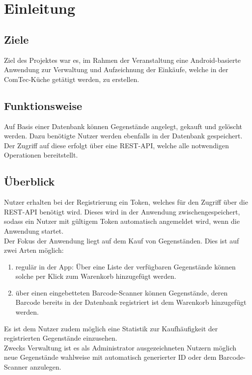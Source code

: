 \section{Einleitung}\label{sec:einleitung}

\subsection{Ziele}\label{subsec:ziele}

Ziel des Projektes war es, im Rahmen der Veranstaltung  eine Android-basierte Anwendung zur Verwaltung und Aufzeichnung der Einkäufe, welche in der ComTec-Küche getätigt werden, zu erstellen.

\subsection{Funktionsweise}\label{subsec:funktionsweise}

Auf Basis einer Datenbank können Gegenstände angelegt, gekauft und gelöscht werden.
Dazu benötigte Nutzer werden ebenfalls in der Datenbank gespeichert.
Der Zugriff auf diese erfolgt über eine REST-API, welche alle notwendigen Operationen bereitstellt.

\subsection{Überblick}\label{subsec:überblick}

Nutzer erhalten bei der Registrierung ein Token, welches für den Zugriff über die REST-API benötigt wird.
Dieses wird in der Anwendung zwischengespeichert, sodass ein Nutzer mit gültigem Token automatisch angemeldet wird, wenn die Anwendung startet. \\
Der Fokus der Anwendung liegt auf dem Kauf von Gegenständen.
Dies ist auf zwei Arten möglich:

\begin{enumerate}
	\item regulär in der App: Über eine Liste der verfügbaren Gegenstände können solche per Klick zum Warenkorb hinzugefügt werden.

	\item über einen eingebetteten Barcode-Scanner können Gegenstände, deren Barcode bereits in der Datenbank registriert ist dem Warenkorb hinzugefügt werden.
\end{enumerate}

Es ist dem Nutzer zudem möglich eine Statistik zur Kaufhäufigkeit der registrierten Gegenstände einzusehen. \\
Zwecks Verwaltung ist es als Administrator ausgezeichneten Nutzern möglich neue Gegenstände wahlweise mit automatisch generierter ID oder dem Barcode-Scanner anzulegen.

